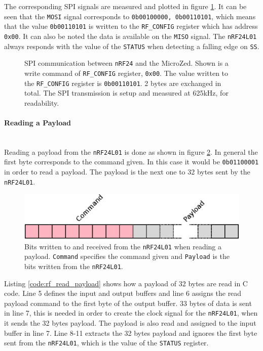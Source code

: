 The corresponding SPI signals are measured and plotted in figure \ref{fig:nrf24_spi}.
It can be seen that the \texttt{MOSI} signal corresponds to \texttt{0b00100000, 0b00110101}, which means that the value \texttt{0b00110101} is written to the \texttt{RF\_CONFIG} register which has address \texttt{0x00}.
It can also be noted the data is available on the \texttt{MISO} signal. 
The \texttt{nRF24L01} always responds with the value of the \texttt{STATUS} when detecting a falling edge on \texttt{SS}.

\begin{figure}[h]
	\centering
    
	\caption[SPI communication between nRF24 and the MicroZed]{SPI communication between \texttt{nRF24} and the MicroZed. Shown is a write command of \texttt{RF\_CONFIG} register, \texttt{0x00}. The value written to the \texttt{RF\_CONFIG} register is \texttt{0b00110101}. 2 bytes are exchanged in total. The SPI transmission is setup and measured at 625kHz, for readability.}
	\label{fig:nrf24_spi}
\end{figure}

\paragraph{Reading a Payload} %
\label{par:reading_a_payload}
~\\
Reading a payload from the \texttt{nRF24L01} is done as shown in figure \ref{fig:rxtx_payload}.
In general the first byte corresponds to the command given. 
In this case it would be \texttt{0b01100001} in order to read a payload.
The payload is the next one to 32 bytes sent by the \texttt{nRF24L01}.
\begin{figure}[h]
	\centering
	\includegraphics[width=.6\linewidth]{graphics/rxtx_payload.eps}
	\caption[Reading a payload on the nRF24L01.]{Bits written to and received from the \texttt{nRF24L01} when reading a payload. \texttt{Command} specifies the command given and \texttt{Payload} is the bits written from the \texttt{nRF24L01}.}
	\label{fig:rxtx_payload}
\end{figure}

Listing \ref{code:rf_read_payload} shows how a payload of 32 bytes are read in C code. 
Line 5 defines the input and output buffers and line 6 assigns the read payload command to the first byte of the output buffer.
33 bytes of data is sent in line 7, this is needed in order to create the clock signal for the \texttt{nRF24L01}, when it sends the 32 bytes payload.
The payload is also read and assigned to the input buffer in line 7.
Line 8-11 extracts the 32 bytes payload and ignores the first byte sent from the \texttt{nRF24L01}, which is the value of the \texttt{STATUS} register.

